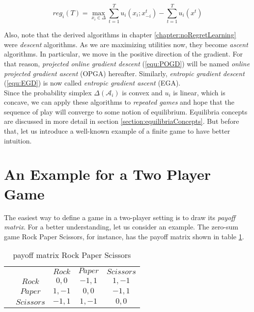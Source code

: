 \begin{equation*}
    reg_{i}(T) = \max_{x_i \in \Delta}\sum_{t=1}^{T} u_i(x_i;x_{-i}^{t}) - \sum_{t=1}^{T}u_i(x^t)
\end{equation*}

Also, note that the derived algorithms in chapter \ref{chapter:noRegretLearning} were \textit{descent} algorithms. As we are maximizing utilities now, they become \textit{ascent} algorithms. In particular, we move in the positive direction of the gradient. For that reason, \textit{projected online gradient descent} (\ref{equ:POGD}) will be named \textit{online projected gradient ascent} (OPGA) hereafter. Similarly, \textit{entropic gradient descent} (\ref{equ:EGD}) is now called \textit{entropic gradient ascent} (EGA). \\

Since the probability simplex $\Delta(\mathcal{A}_i)$ is convex and $u_i$ is linear, which is concave, we can apply these algorithms to \textit{repeated games} and hope that the sequence of play will converge to some notion of equilibrium. Equilibria concepts are discussed in more detail in section \ref{section:equilibriaConcepts}. But before that, let us introduce a well-known example of a finite game to have better intuition.


\section{An Example for a Two Player Game}\label{section:anExample}

The easiest way to define a game in a two-player setting is to draw its \textit{payoff matrix}. For a better understanding, let us consider an example. The zero-sum game Rock Paper Scissors, for instance, has the payoff matrix shown in table \ref{tab:payoffRPSFromDefinition}. \\

\begin{table}\centering
\setlength{\extrarowheight}{2pt}
\begin{tabular}{cc|c|c|c|}
  & \multicolumn{1}{c}{} & \multicolumn{1}{c}{$Rock$}  & \multicolumn{1}{c}{$Paper$}  & \multicolumn{1}{c}{$Scissors$} \\\cline{3-5}
            & $Rock$ & $0,0$ & $-1,1$ & $1,-1$ \\ \cline{3-5}
            & $Paper$ & $1,-1$ & $0,0$ & $-1,1$ \\\cline{3-5}
            & $Scissors$ & $-1,1$ & $1,-1$ & $0,0$ \\\cline{3-5}
\end{tabular}\caption{\label{tab:payoffRPSFromDefinition}payoff matrix Rock Paper Scissors}
\end{table}

